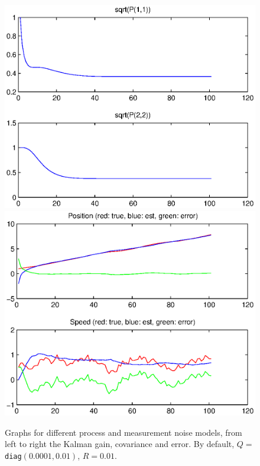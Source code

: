 \documentclass[a4paper,12pt]{article}
\begin{document}
\begin{enumerate}
\begin{figure}
{{          \includegraphics[width=.43\textwidth]{figures/kf/highr_covar}
          \includegraphics[width=.43\textwidth]{figures/kf/highr_error}
        }
        \label{fig:hir}
      }
      \caption{Graphs for different process and measurement noise models, from
        left to right the Kalman gain, covariance and error. By default,
        $Q=$ \texttt{diag}$(0.0001,0.01)$, $R=0.01$.}
  \end{figure}
  \begin{figure}
    \renewcommand{\figurename}{Figure (cont.)}
    \ContinuedFloat
\end{figure}
\end{enumerate}
\end{document}
